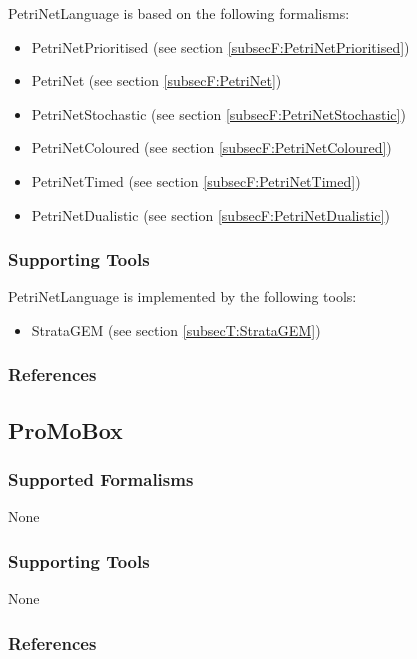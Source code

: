 PetriNetLanguage is based on the following formalisms:
\begin{itemize}
	\item PetriNetPrioritised (see section \ref{subsecF:PetriNetPrioritised})
	\item PetriNet (see section \ref{subsecF:PetriNet})
	\item PetriNetStochastic (see section \ref{subsecF:PetriNetStochastic})
	\item PetriNetColoured (see section \ref{subsecF:PetriNetColoured})
	\item PetriNetTimed (see section \ref{subsecF:PetriNetTimed})
	\item PetriNetDualistic (see section \ref{subsecF:PetriNetDualistic})
\end{itemize}


\subsubsection{Supporting Tools}

PetriNetLanguage is implemented by the following tools:
\begin{itemize}
	\item StrataGEM (see section \ref{subsecT:StrataGEM})
\end{itemize}



\subsubsection{References}






\subsection{ProMoBox}
\label{subsecL:ProMoBox}


\subsubsection{Supported Formalisms}

None


\subsubsection{Supporting Tools}

None


\subsubsection{References}





